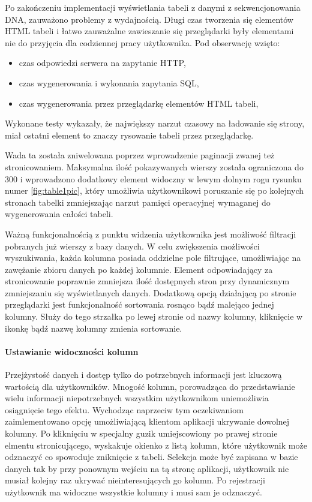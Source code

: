 \documentclass[a4paper,12pt,twoside]{article}
\begin{document}
Po zakończeniu implementacji wyświetlania tabeli z danymi z sekwencjonowania DNA,
zauważono problemy z wydajnością.
Długi czas tworzenia się elementów HTML tabeli i łatwo zauważalne zawieszanie się przeglądarki
były elementami nie do przyjęcia dla codziennej pracy użytkownika.
Pod obserwację wzięto:
\begin{itemize}
\item czas odpowiedzi serwera na zapytanie HTTP,
\item czas wygenerowania i wykonania zapytania SQL,
\item czas wygenerowania przez przeglądarkę elementów HTML tabeli,
\end{itemize} 
Wykonane testy wykazały, że największy narzut czasowy na ładowanie się strony, miał ostatni 
element to znaczy rysowanie tabeli przez przeglądarkę. 

Wada ta została zniwelowana poprzez wprowadzenie paginacji zwanej też stronicowaniem.
Maksymalna ilość pokazywanych wierszy została ograniczona do 300 i wprowadzono dodatkowy 
element widoczny w lewym dolnym rogu rysunku numer \ref{fig:table1pic}, który umożliwia 
użytkownikowi poruszanie się po kolejnych stronach tabelki zmniejszając narzut 
pamięci operacyjnej wymaganej do wygenerowania całości tabeli.  


Ważną funkcjonalnością z punktu widzenia użytkownika jest możliwość filtracji pobranych już wierszy
z bazy danych. W celu zwiększenia możliwości wyszukiwania, każda kolumna posiada oddzielne pole 
filtrujące, umożliwiając na zawężanie zbioru danych po każdej kolumnie. Element odpowiadający
za stronicowanie poprawnie zmniejsza ilość dostępnych stron przy dynamicznym zmniejszaniu się
wyświetlanych danych.
Dodatkową opcją działającą po stronie przeglądarki jest 
funkcjonalność sortowania rosnąco bądź malejąco jednej kolumny. Służy do tego strzałka po
lewej stronie od nazwy kolumny, kliknięcie w ikonkę bądź nazwę kolumny zmienia sortowanie.

\newpage
\paragraph{Ustawianie widoczności kolumn}
Przejżystość danych i dostęp tylko do potrzebnych informacji jest kluczową wartością dla użytkowników.
Mnogość kolumn, porowadząca do przedstawianie wielu informacji niepotrzebnych 
wszystkim użytkownikom uniemożliwia osiągnięcie tego efektu. Wychodząc naprzeciw tym oczekiwaniom 
zaimlementowano opcję umożliwiającą klientom aplikacji ukrywanie dowolnej kolumny.
Po kliknięciu w specjalny guzik umiejscowiony po prawej stronie elmentu stronicującego, wyskakuje okienko z listą kolumn,
które użytkownik może odznaczyć co spowoduje zniknięcie z tabeli. Selekcja może być zapisana 
w bazie danych tak by przy ponownym wejściu na tą stronę aplikacji, użytkownik nie musiał
kolejny raz ukrywać nieinteresujących go kolumn. Po rejestracji użytkownik ma widoczne wszystkie
kolumny i musi sam je odznaczyć.
 
\end{document}
